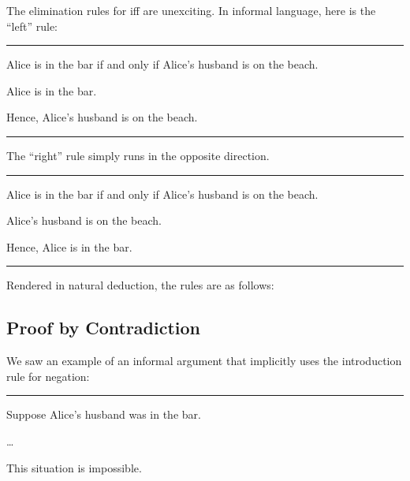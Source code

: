 \documentclass[letterpaper,10pt,english]{sphinxmanual}
\begin{document}
\begin{center}
\AXM{}
\noLine
\UIM{\vdots}
\noLine
{}
\AXM{}
\noLine
\UIM{\vdots}
\noLine
{}
\DP
\end{center}

\sphinxAtStartPar
The elimination rules for iff are unexciting. In informal language, here is the “left” rule:


\bigskip\hrule\bigskip


\sphinxAtStartPar
Alice is in the bar if and only if Alice’s husband is on the beach.

\sphinxAtStartPar
Alice is in the bar.

\sphinxAtStartPar
Hence, Alice’s husband is on the beach.


\bigskip\hrule\bigskip


\sphinxAtStartPar
The “right” rule simply runs in the opposite direction.


\bigskip\hrule\bigskip


\sphinxAtStartPar
Alice is in the bar if and only if Alice’s husband is on the beach.

\sphinxAtStartPar
Alice’s husband is on the beach.

\sphinxAtStartPar
Hence, Alice is in the bar.


\bigskip\hrule\bigskip


\sphinxAtStartPar
Rendered in natural deduction, the rules are as follows:



\begin{center}
\DP
\quad
{}
\DP
\end{center}


\subsection{Proof by Contradiction}
\label{\detokenize{propositional_logic:proof-by-contradiction}}
\sphinxAtStartPar
We saw an example of an informal argument that implicitly uses the introduction rule for negation:


\bigskip\hrule\bigskip


\sphinxAtStartPar
Suppose Alice’s husband was in the bar.

\sphinxAtStartPar
…

\sphinxAtStartPar
This situation is impossible.
\end{document}
